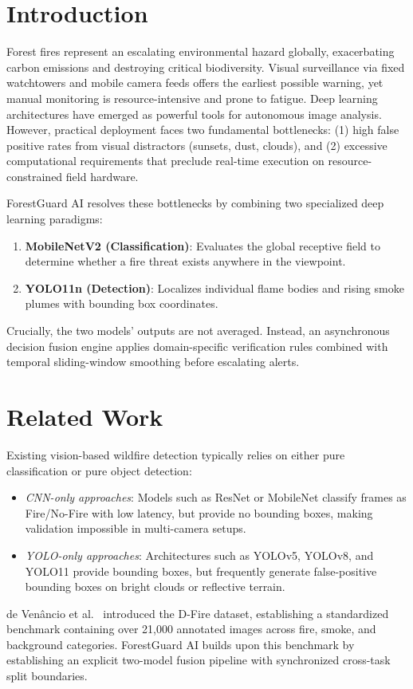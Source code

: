 \documentclass[conference]{IEEEtran}
\begin{document}
\section{Introduction}
Forest fires represent an escalating environmental hazard globally, exacerbating carbon emissions and destroying critical biodiversity. Visual surveillance via fixed watchtowers and mobile camera feeds offers the earliest possible warning, yet manual monitoring is resource-intensive and prone to fatigue. Deep learning architectures have emerged as powerful tools for autonomous image analysis. However, practical deployment faces two fundamental bottlenecks: (1) high false positive rates from visual distractors (sunsets, dust, clouds), and (2) excessive computational requirements that preclude real-time execution on resource-constrained field hardware.

ForestGuard AI resolves these bottlenecks by combining two specialized deep learning paradigms:
\begin{enumerate}
    \item \textbf{MobileNetV2 (Classification)}: Evaluates the global receptive field to determine whether a fire threat exists anywhere in the viewpoint.
    \item \textbf{YOLO11n (Detection)}: Localizes individual flame bodies and rising smoke plumes with bounding box coordinates.
\end{enumerate}

Crucially, the two models' outputs are not averaged. Instead, an asynchronous decision fusion engine applies domain-specific verification rules combined with temporal sliding-window smoothing before escalating alerts.

\section{Related Work}
Existing vision-based wildfire detection typically relies on either pure classification or pure object detection:
\begin{itemize}
    \item \textit{CNN-only approaches}: Models such as ResNet or MobileNet classify frames as Fire/No-Fire with low latency, but provide no bounding boxes, making validation impossible in multi-camera setups.
    \item \textit{YOLO-only approaches}: Architectures such as YOLOv5, YOLOv8, and YOLO11 provide bounding boxes, but frequently generate false-positive bounding boxes on bright clouds or reflective terrain.
\end{itemize}
de Ven{\^a}ncio et al.~\cite{devenancio2022dfire} introduced the D-Fire dataset, establishing a standardized benchmark containing over 21,000 annotated images across fire, smoke, and background categories. ForestGuard AI builds upon this benchmark by establishing an explicit two-model fusion pipeline with synchronized cross-task split boundaries.
\end{document}
